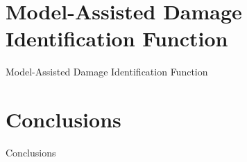 \documentclass[10pt]{beamer} %
\begin{document}
\section{Model-Assisted Damage Identification Function}
\begin{frame}[label=frame]{Model-Assisted Damage Identification Function}

\end{frame}
\section{Conclusions}
\begin{frame}[label=frame]{Conclusions}

\end{frame}
\end{document}
